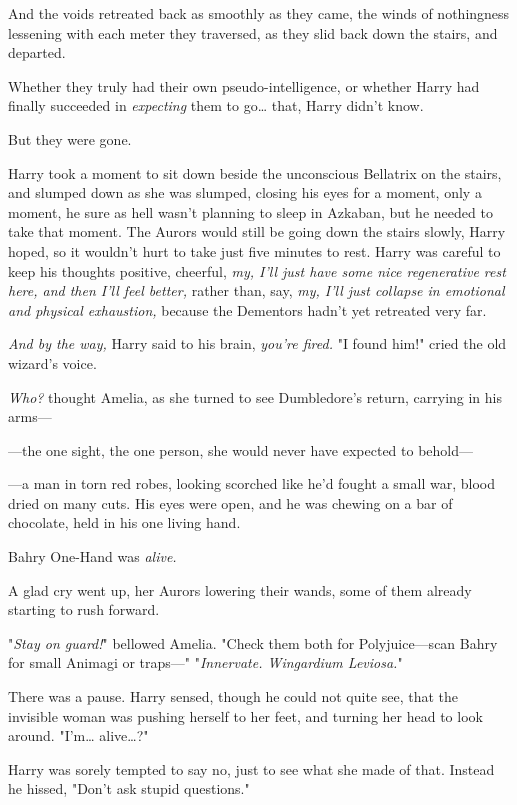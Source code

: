 And the voids retreated back as smoothly as they came, the winds of nothingness 
lessening with each meter they traversed, as they slid back down the stairs, 
and departed.

Whether they truly had their own pseudo-intelligence, or whether Harry had 
finally succeeded in \emph{expecting} them to go{\ldots} that, Harry didn't 
know.

But they were gone.

Harry took a moment to sit down beside the unconscious Bellatrix on the stairs, 
and slumped down as she was slumped, closing his eyes for a moment, only a 
moment, he sure as hell wasn't planning to sleep in Azkaban, but he needed to 
take that moment. The Aurors would still be going down the stairs slowly, Harry 
hoped, so it wouldn't hurt to take just five minutes to rest. Harry was careful 
to keep his thoughts positive, cheerful, \emph{my, I'll just have some nice 
regenerative rest here, and then I'll feel better,} rather than, say, \emph{my, 
I'll just collapse in emotional and physical exhaustion,} because the Dementors 
hadn't yet retreated very far.

\emph{And by the way,} Harry said to his brain, \emph{you're fired.}
\sbreak
"I found him!" cried the old wizard's voice.

\emph{Who?} thought Amelia, as she turned to see Dumbledore's return, carrying 
in his arms---

---the one sight, the one person, she would never have expected to behold---

---a man in torn red robes, looking scorched like he'd fought a small war, 
blood dried on many cuts. His eyes were open, and he was chewing on a bar of 
chocolate, held in his one living hand.

Bahry One-Hand was \emph{alive.}

A glad cry went up, her Aurors lowering their wands, some of them already 
starting to rush forward.

"\emph{Stay on guard!}" bellowed Amelia. "Check them both for Polyjuice---scan 
Bahry for small Animagi or traps---"
\sbreak
"\emph{Innervate. Wingardium Leviosa.}"

There was a pause. Harry sensed, though he could not quite see, that the 
invisible woman was pushing herself to her feet, and turning her head to look 
around. "I'm{\ldots} alive{\ldots}?"

Harry was sorely tempted to say no, just to see what she made of that. Instead 
he hissed, "Don't ask stupid questions."

